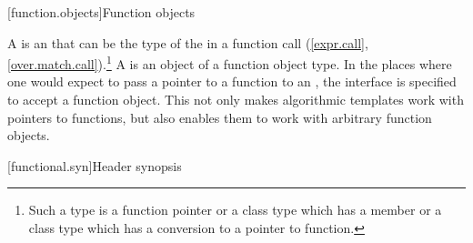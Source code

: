 [function.objects]{Function objects}

\pnum
A  is an
 that can be the type of the
 in a function call
(\ref{expr.call}, \ref{over.match.call}).\footnote{Such a type is a function
pointer or a class type which has a member  or a class type
which has a conversion to a pointer to function.} A  is an
object of a function object type. In the places where one would expect to pass a
pointer to a function to an , the
interface is specified to accept a function object. This not only makes
algorithmic templates work with pointers to functions, but also enables them to
work with arbitrary function objects.

[functional.syn]{Header  synopsis}

